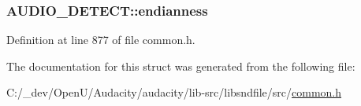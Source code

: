\subsubsection[{\texorpdfstring{endianness}{endianness}}]{ A\+U\+D\+I\+O\+\_\+\+D\+E\+T\+E\+C\+T\+::endianness}\hypertarget{struct_a_u_d_i_o___d_e_t_e_c_t_af54b23731260370c65020311231a633c}{}\label{struct_a_u_d_i_o___d_e_t_e_c_t_af54b23731260370c65020311231a633c}


Definition at line 877 of file common.\+h.



The documentation for this struct was generated from the following file\+:\begin{DoxyCompactItemize}
\item 
C\+:/\+\_\+dev/\+Open\+U/\+Audacity/audacity/lib-\/src/libsndfile/src/\hyperlink{libsndfile_2src_2common_8h}{common.\+h}\end{DoxyCompactItemize}
